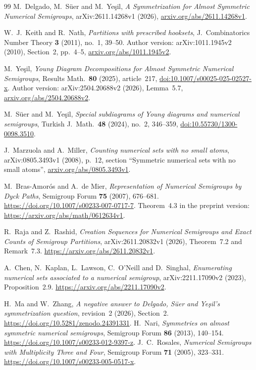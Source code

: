 \documentclass[11pt,a4paper]{article}
\theoremstyle{definition}
\theoremstyle{remark}
\begin{document}
\begin{thebibliography}{99}
\small
{}
M.~Delgado, M.~S\"uer and M.~Ye\c{s}il,
\emph{A Symmetrization for Almost Symmetric Numerical Semigroups},
arXiv:2611.14268v1 (2026),
\href{https://arxiv.org/abs/2611.14268v1}{arxiv.org/abs/2611.14268v1}.

W.~J.~Keith and R.~Nath,
\emph{Partitions with prescribed hooksets},
J.~Combinatorics Number Theory \textbf{3} (2011), no.~1, 39--50.
Author version: arXiv:1011.1945v2 (2010), Section~2, pp.~4--5,
\href{https://arxiv.org/abs/1011.1945v2}{arxiv.org/abs/1011.1945v2}.

M.~Ye\c{s}il,
\emph{Young Diagram Decompositions for Almost Symmetric Numerical Semigroups},
Results Math.~\textbf{80} (2025), article~217,
\href{https://doi.org/10.1007/s00025-025-02527-x}{doi:10.1007/s00025-025-02527-x}.
Author version: arXiv:2504.20688v2 (2026), Lemma~5.7,
\href{https://arxiv.org/abs/2504.20688v2}{arxiv.org/abs/2504.20688v2}.

M.~S\"uer and M.~Ye\c{s}il,
\emph{Special subdiagrams of Young diagrams and numerical semigroups},
Turkish J.~Math.~\textbf{48} (2024), no.~2, 346--359,
\href{https://doi.org/10.55730/1300-0098.3510}{doi:10.55730/1300-0098.3510}.

J.~Marzuola and A.~Miller,
\emph{Counting numerical sets with no small atoms}, arXiv:0805.3493v1 (2008),
p.~12, section ``Symmetric numerical sets with no small atoms'',
\href{https://arxiv.org/abs/0805.3493v1}{arxiv.org/abs/0805.3493v1}.

M.~Bras-Amor\'os and A.~de Mier,
\emph{Representation of Numerical Semigroups by Dyck Paths},
Semigroup Forum \textbf{75} (2007), 676--681.
\url{https://doi.org/10.1007/s00233-007-0717-7}.
Theorem~4.3 in the preprint version:
\url{https://arxiv.org/abs/math/0612634v1}.

R.~Raja and Z.~Rashid,
\emph{Creation Sequences for Numerical Semigroups and Exact Counts of
Semigroup Partitions}, arXiv:2611.20832v1 (2026), Theorem~7.2 and Remark~7.3.
\url{https://arxiv.org/abs/2611.20832v1}.

A.~Chen, N.~Kaplan, L.~Lawson, C.~O'Neill and D.~Singhal,
\emph{Enumerating numerical sets associated to a numerical semigroup},
arXiv:2211.17090v2 (2023), Proposition~2.9.
\url{https://arxiv.org/abs/2211.17090v2}.

H.~Ma and W.~Zhang,
\emph{A negative answer to Delgado, S\"uer and Ye\c{s}il's symmetrization question},
revision~2 (2026), Section~2.
\url{https://doi.org/10.5281/zenodo.24391331}.
 H.~Nari, \emph{Symmetries on almost symmetric numerical
semigroups}, Semigroup Forum \textbf{86} (2013), 140--154.
\url{https://doi.org/10.1007/s00233-012-9397-z}.
 J.~C.~Rosales, \emph{Numerical Semigroups with
Multiplicity Three and Four}, Semigroup Forum \textbf{71} (2005), 323--331.
\url{https://doi.org/10.1007/s00233-005-0517-x}.


\end{thebibliography}
\end{document}

